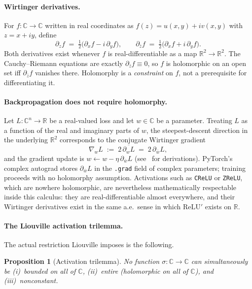 \documentclass{article}
\newtheorem{proposition}{Proposition}
\newcommand{\code}[1]{\texttt{#1}}
\begin{document}
\paragraph{Wirtinger derivatives.}
For $f:\mathbb{C}\to\mathbb{C}$ written in real coordinates as
$f(z)=u(x,y)+iv(x,y)$ with $z=x+iy$, define
\[
  \partial_z f \;=\; \tfrac{1}{2}\bigl(\partial_x f - i\,\partial_y f\bigr),
  \qquad
  \partial_{\bar z} f \;=\; \tfrac{1}{2}\bigl(\partial_x f + i\,\partial_y f\bigr).
\]
Both derivatives exist whenever $f$ is real-differentiable as a map
$\mathbb{R}^2\to\mathbb{R}^2$. The Cauchy--Riemann equations are
exactly $\partial_{\bar z} f \equiv 0$, so $f$ is holomorphic on an
open set iff $\partial_{\bar z} f$ vanishes there. Holomorphy is a
\emph{constraint} on $f$, not a prerequisite for differentiating it.

\paragraph{Backpropagation does not require holomorphy.}
Let $L:\mathbb{C}^n\to\mathbb{R}$ be a real-valued loss and let
$w\in\mathbb{C}$ be a parameter. Treating $L$ as a function of the
real and imaginary parts of $w$, the steepest-descent direction in the
underlying $\mathbb{R}^2$ corresponds to the conjugate Wirtinger
gradient
\[
  \nabla_w L \;:=\; 2\,\overline{\partial_{w}L}
  \;=\; 2\,\partial_{\bar w} L,
\]
and the gradient update is $w \leftarrow w - \eta\,\partial_{\bar w}L$
(see~\cite{brandwood1983complex,kreutzdelgado2009complex} for
derivations). PyTorch's complex autograd stores
$\partial_{\bar w}L$ in the \code{.grad} field of complex parameters;
training proceeds with no holomorphy assumption. Activations such as
\code{CReLU} or \code{ZReLU}, which are nowhere holomorphic, are
nevertheless mathematically respectable inside this calculus: they are
real-differentiable almost everywhere, and their Wirtinger derivatives
exist in the same a.e.\ sense in which $\mathrm{ReLU}'$ exists on
$\mathbb{R}$.

\paragraph{The Liouville activation trilemma.}
The actual restriction Liouville imposes is the following.

\begin{proposition}[Activation trilemma]
\label{prop:trilemma}
No function $\sigma:\mathbb{C}\to\mathbb{C}$ can simultaneously be
\emph{(i)}~bounded on all of $\mathbb{C}$, \emph{(ii)}~entire
(holomorphic on all of $\mathbb{C}$), and \emph{(iii)}~nonconstant.
\end{proposition}
\end{document}
